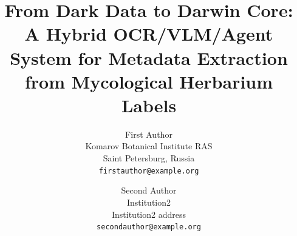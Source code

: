 \documentclass[10pt,twocolumn,letterpaper]{article}
\title{From Dark Data to Darwin Core: A Hybrid OCR/VLM/Agent System for
Metadata Extraction from Mycological Herbarium Labels}
\author{First Author\\
Komarov Botanical Institute RAS\\
Saint Petersburg, Russia\\
{\tt\small firstauthor@example.org}
\and
Second Author\\
Institution2\\
Institution2 address\\
{\tt\small secondauthor@example.org}
}
\begin{document}
\maketitle
    




{
    \small
    
    
}

% 
\end{document}
